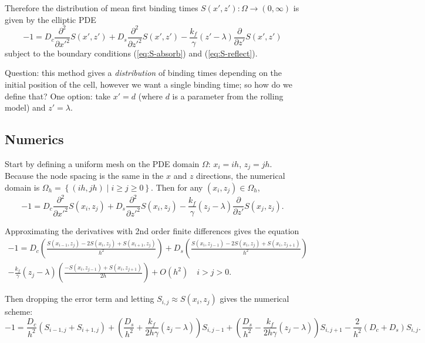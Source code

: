 \documentclass{article}
\newcommand{\stiff}{\frac{k_f}{\gamma}}
\newcommand{\Pder}[2]{\frac{\partial #1}{\partial #2}}
\begin{document}
Therefore the distribution of mean first binding times $S(x', z'):
\Omega \rightarrow (0, \infty)$ is given by the elliptic PDE
\begin{equation}
  \label{eq:S-pde}
  -1 = D_c \frac{\partial^2}{\partial x'^2}S(x', z') + D_s
  \frac{\partial^2}{\partial z'^2}S(x', z') - \stiff (z' - \lambda)
  \Pder{}{z'}S(x', z')
\end{equation}
subject to the boundary conditions (\ref{eq:S-absorb}) and
(\ref{eq:S-reflect}).

Question: this method gives a \emph{distribution} of binding times
depending on the initial position of the cell, however we want a
single binding time; so how do we define that? One option: take $x' =
d$ (where $d$ is a parameter from the rolling model) and $z' =
\lambda$.

\subsection{Numerics}
\label{sec:numerics}

Start by defining a uniform mesh on the PDE domain $\Omega$: $x_i =
ih$, $z_j = jh$. Because the node spacing is the same in the $x$ and
$z$ directions, the numerical domain is $\Omega_h = \left\{ (ih, jh)
  \mid i \ge j \ge 0\right\}$. Then for any $(x_i, z_j) \in \Omega_h$,
\begin{equation}
  \label{eq:num1}
  -1 = D_c \frac{\partial^2}{\partial x'^2}S(x_i, z_j) + D_s
  \frac{\partial^2}{\partial z'^2} S(x_i, z_j) - \stiff(z_j - \lambda)
  \Pder{}{z'}S(x_j, z_j).
\end{equation}

Approximating the derivatives with 2nd order finite differences gives
the equation
\begin{multline}
  -1 = D_c \left( \frac{S(x_{i-1}, z_j) - 2S(x_i, z_j) + S(x_{i+1},
      z_j)}{h^2} \right) + D_s \left( \frac{S(x_i, z_{j-1}) - 2S(x_i,
      z_j) + S(x_i, z_{j+1})}{h^2} \right) \\ 
  - \stiff(z_j - \lambda) \left( \frac{-S(x_i, z_{j-1}) + S(x_i,
      z_{j+1})}{2h} \right) + O(h^2) \quad i > j > 0.
\end{multline}

Then dropping the error term and letting $S_{i,j} \approx S(x_i, z_j)$
gives the numerical scheme:
\begin{equation}
  \label{eq:scheme}
  -1 = \frac{D_c}{h^2} \left(S_{i-1, j} + S_{i+1, j} \right) + \left(
    \frac{D_s}{h^2} + \frac{k_f}{2h\gamma}(z_j - \lambda) \right)
  S_{i, j-1} + \left( \frac{D_s}{h^2} - \frac{k_f}{2h\gamma}(z_j -
    \lambda) \right) S_{i, j+1} - \frac{2}{h^2}(D_c + D_s) S_{i, j}.
\end{equation}
\end{document}
